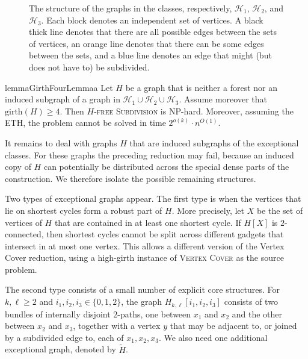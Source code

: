 \documentclass[a4paper,UKenglish,cleveref, autoref, thm-restate]{lipics-v2021}
\newcommand{\girth}{\mathrm{girth}}
\newcommand{\cH}{\mathcal{H}}
\begin{document}
\begin{center}
\begin{figure}[t]
\begin{tikzpicture}[every node/.style={draw,circle,fill=white,inner sep=0pt,minimum size=8pt},every loop/.style={},scale=0.8]
\end{tikzpicture}
     \caption{The structure of the graphs in the classes, respectively, $\cH_1$, $\cH_2$, and $\cH_3$. Each block denotes an independent set of vertices. A black thick line denotes that there are all possible edges between the sets of vertices, an orange line denotes that there can be some edges between the sets, and a blue line denotes an edge that might (but does not have to) be subdivided.}
    \label{fig:graphs-def}
\end{figure}
\end{center}


\begin{restatable}{lemma}{GirthFourLemmaa}
\label{lem:girth-4-a}
Let $H$ be a graph that is neither a forest nor an induced subgraph of a graph in
$\mathcal H_1\cup \mathcal H_2\cup \mathcal H_3$.
Assume moreover that $\girth(H)\geq 4$.
Then \textsc{$H$-free Subdivision} is NP-hard.
Moreover, assuming the ETH, the problem cannot be solved in time
$2^{o(k)}\cdot n^{O(1)}$.
\end{restatable}

It remains to deal with graphs $H$ that are induced subgraphs of the exceptional classes.
For these graphs the preceding reduction may fail, because an induced copy of $H$ can potentially be distributed across the special dense parts of the construction.
We therefore isolate the possible remaining structures.

Two types of exceptional graphs appear.
The first type is when the vertices that lie on shortest cycles form a robust part of $H$.
More precisely, let $X$ be the set of vertices of $H$ that are contained in at least one shortest cycle.
If $H[X]$ is $2$-connected, then shortest cycles cannot be split across different gadgets that intersect in at most one vertex.
This allows a different version of the Vertex Cover reduction, using a high-girth instance of \textsc{Vertex Cover} as the source problem.

The second type consists of a small number of explicit core structures.
For $k,\ell\geq 2$ and $i_1,i_2,i_3\in\{0,1,2\}$, the graph
$H_{k,\ell}[i_1,i_2,i_3]$ consists of two bundles of internally disjoint $2$-paths, one between $x_1$ and $x_2$ and the other between $x_2$ and $x_3$, together with a vertex $y$ that may be adjacent to, or joined by a subdivided edge to, each of $x_1,x_2,x_3$.
We also need one additional exceptional graph, denoted by $\widetilde H$.
\end{document}
